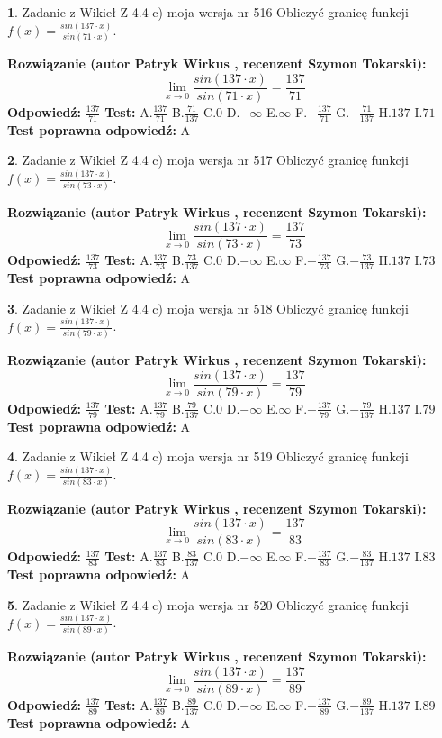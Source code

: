\documentclass[12pt, a4paper]{article}
\theoremstyle{definition} %
\newtheorem{zad}{}
\newcommand{\zadStart}[1]{\begin{zad}#1\newline}
\newcommand{\zadStop}{\end{zad}}
\newcommand{\rozwStart}[2]{\noindent \textbf{Rozwiązanie (autor #1 , recenzent #2): }\newline}
\newcommand{\rozwStop}{\newline}
\newcommand{\odpStart}{\noindent \textbf{Odpowiedź:}\newline}
\newcommand{\odpStop}{\newline}
\newcommand{\testStart}{\noindent \textbf{Test:}\newline}
\newcommand{\testStop}{\newline}
\newcommand{\kluczStart}{\noindent \textbf{Test poprawna odpowiedź:}\newline}
\newcommand{\kluczStop}{\newline}
\begin{document}
\zadStart{Zadanie z Wikieł Z 4.4 c) moja wersja nr 516}
Obliczyć granicę funkcji $f(x)=\frac{sin(137\cdot x)}{sin(71\cdot x)}$.
\zadStop
\rozwStart{Patryk Wirkus}{Szymon Tokarski}
$$\lim\limits_{x\to 0}\frac{sin(137\cdot x)}{sin(71\cdot x)}=
\frac{137}{71}$$
\rozwStop
\odpStart
$\frac{137}{71}$
\odpStop
\testStart
A.$\frac{137}{71}$
B.$\frac{71}{137}$
C.$0$
D.$-\infty$
E.$\infty$
F.$-\frac{137}{71}$
G.$-\frac{71}{137}$
H.$137$
I.$71$
\testStop
\kluczStart
A
\kluczStop



\zadStart{Zadanie z Wikieł Z 4.4 c) moja wersja nr 517}
Obliczyć granicę funkcji $f(x)=\frac{sin(137\cdot x)}{sin(73\cdot x)}$.
\zadStop
\rozwStart{Patryk Wirkus}{Szymon Tokarski}
$$\lim\limits_{x\to 0}\frac{sin(137\cdot x)}{sin(73\cdot x)}=
\frac{137}{73}$$
\rozwStop
\odpStart
$\frac{137}{73}$
\odpStop
\testStart
A.$\frac{137}{73}$
B.$\frac{73}{137}$
C.$0$
D.$-\infty$
E.$\infty$
F.$-\frac{137}{73}$
G.$-\frac{73}{137}$
H.$137$
I.$73$
\testStop
\kluczStart
A
\kluczStop



\zadStart{Zadanie z Wikieł Z 4.4 c) moja wersja nr 518}
Obliczyć granicę funkcji $f(x)=\frac{sin(137\cdot x)}{sin(79\cdot x)}$.
\zadStop
\rozwStart{Patryk Wirkus}{Szymon Tokarski}
$$\lim\limits_{x\to 0}\frac{sin(137\cdot x)}{sin(79\cdot x)}=
\frac{137}{79}$$
\rozwStop
\odpStart
$\frac{137}{79}$
\odpStop
\testStart
A.$\frac{137}{79}$
B.$\frac{79}{137}$
C.$0$
D.$-\infty$
E.$\infty$
F.$-\frac{137}{79}$
G.$-\frac{79}{137}$
H.$137$
I.$79$
\testStop
\kluczStart
A
\kluczStop



\zadStart{Zadanie z Wikieł Z 4.4 c) moja wersja nr 519}
Obliczyć granicę funkcji $f(x)=\frac{sin(137\cdot x)}{sin(83\cdot x)}$.
\zadStop
\rozwStart{Patryk Wirkus}{Szymon Tokarski}
$$\lim\limits_{x\to 0}\frac{sin(137\cdot x)}{sin(83\cdot x)}=
\frac{137}{83}$$
\rozwStop
\odpStart
$\frac{137}{83}$
\odpStop
\testStart
A.$\frac{137}{83}$
B.$\frac{83}{137}$
C.$0$
D.$-\infty$
E.$\infty$
F.$-\frac{137}{83}$
G.$-\frac{83}{137}$
H.$137$
I.$83$
\testStop
\kluczStart
A
\kluczStop



\zadStart{Zadanie z Wikieł Z 4.4 c) moja wersja nr 520}
Obliczyć granicę funkcji $f(x)=\frac{sin(137\cdot x)}{sin(89\cdot x)}$.
\zadStop
\rozwStart{Patryk Wirkus}{Szymon Tokarski}
$$\lim\limits_{x\to 0}\frac{sin(137\cdot x)}{sin(89\cdot x)}=
\frac{137}{89}$$
\rozwStop
\odpStart
$\frac{137}{89}$
\odpStop
\testStart
A.$\frac{137}{89}$
B.$\frac{89}{137}$
C.$0$
D.$-\infty$
E.$\infty$
F.$-\frac{137}{89}$
G.$-\frac{89}{137}$
H.$137$
I.$89$
\testStop
\kluczStart
A
\kluczStop
\end{document}
